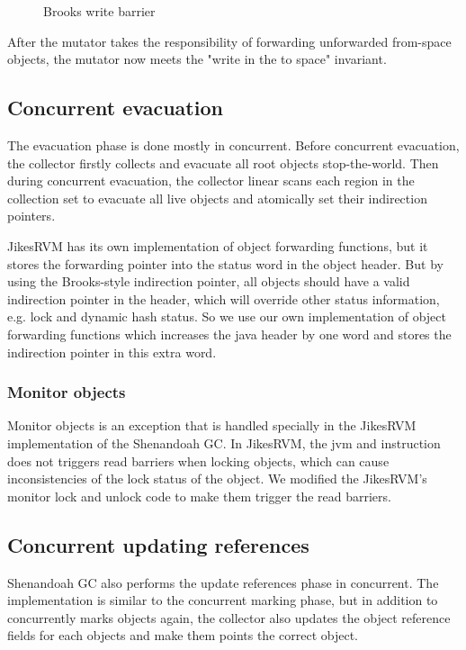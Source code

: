 \begin{figure}
  \centering
  
  \caption{Brooks write barrier}
  \label{fig:brookswritebarrier}
\end{figure}

After the mutator takes the responsibility of forwarding unforwarded from-space objects,
the mutator now meets the "write in the to space" invariant. 

\subsection{Concurrent evacuation}

The evacuation phase is done mostly in concurrent. Before concurrent evacuation,
the collector firstly collects and evacuate all root objects stop-the-world.
Then during concurrent evacuation, the collector linear scans each region in the
collection set to evacuate all live objects and atomically set their indirection
pointers.

JikesRVM has its own implementation of object forwarding functions, but it stores the forwarding
pointer into the status word in the object header. But by using the Brooks-style indirection
pointer, all objects should have a valid indirection pointer in the header, which will override other status
information, e.g. lock and dynamic hash status. So we use our own implementation of
object forwarding functions which increases the java header by one word and stores the indirection
pointer in this extra word.

\subsubsection{Monitor objects}

Monitor objects is an exception that is handled specially in the JikesRVM implementation of the Shenandoah GC.
In JikesRVM, the jvm  and  instruction
does not triggers read barriers when locking objects, which can cause inconsistencies 
of the lock status of the object. We modified the JikesRVM's monitor lock and unlock
code to make them trigger the read barriers.

\subsection{Concurrent updating references}

Shenandoah GC also performs the update references phase in concurrent.
The implementation is similar to the concurrent marking phase, but in addition to
concurrently marks objects again, the collector also updates the object reference fields
for each objects and make them points the correct object.

